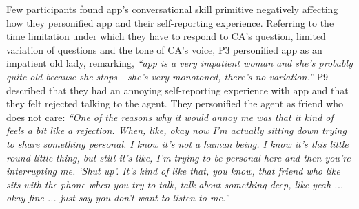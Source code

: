             Few participants found \acl{app}'s conversational skill primitive negatively affecting how they personified \acl{app} and their self-reporting experience.
            Referring to the time limitation under which they have to respond to \ac{CA}'s question, limited variation of questions and the tone of \ac{CA}'s voice, P3 personified \acl{app} as an impatient old lady, remarking,
                \textit{``\acl{app} is a very impatient woman and she’s probably quite old because she stops - she’s very monotoned, there’s no variation.''
                }
            P9 described that they had an annoying self-reporting experience with \acl{app} and that they felt rejected talking to the agent. They personified the agent as friend who does not care:
                \textit{``One of the reasons why it would annoy me was that it kind of feels a bit like a rejection. When, like, okay now I'm actually sitting down trying to share something personal. I know it's not a human being. I know it's this little round little thing, but still it's like, I'm trying to be personal here and then you're interrupting me. `Shut up'. It's kind of like that, you know, that friend who like sits with the phone when you try to talk, talk about something deep, like yeah ... okay fine ... just say you don't want to listen to me.''}
            
